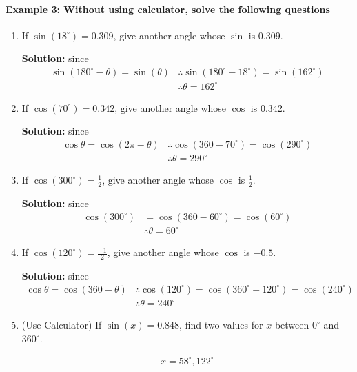 \documentclass{article}
\begin{document}
\paragraph{Example 3: Without using calculator, solve the following questions}
\begin{enumerate}[label=\alph*)]
  \item If $\sin(18^{\circ})= 0.309$, give another angle whose $\sin$ is $0.309$.
        
        {\scriptsize \textbf{Solution:} since}
        \[
        \begin{aligned}
          \sin(180^{\circ}-\theta) = \sin(\theta)
          &\therefore \sin(180^{\circ}-18^{\circ}) = \sin(162^{\circ}) \\
          &\therefore \theta = 162^{\circ}
        \end{aligned}
        \]

  \item If $\cos(70^{\circ})= 0.342$, give another angle whose $\cos$ is $0.342$.

        {\scriptsize \textbf{Solution:} since}
        \[
        \begin{aligned}
          \cos\theta = \cos(2\pi - \theta)
          &\therefore \cos(360-70^{\circ}) = \cos(290^{\circ}) \\
          &\therefore \theta = 290^{\circ}
        \end{aligned}
        \]

  \item If $\cos(300^{\circ})= \frac{1}{2}$, give another angle whose $\cos$ is $\frac{1}{2}$.

        {\scriptsize \textbf{Solution:} since}
        \[
        \begin{aligned}
          \cos(300^{\circ}) &= \cos(360-60^{\circ}) = \cos(60^{\circ}) \\
                       &\therefore \theta = 60^{\circ}
        \end{aligned}
        \]

  \item If $\cos(120^{\circ})= \frac{-1}{2}$, give another angle whose $\cos$ is $-0.5$.

        {\scriptsize \textbf{Solution:} since}
        \[
        \begin{aligned}
          \cos\theta = \cos(360-\theta)
          &\therefore \cos(120^{\circ}) = \cos(360^{\circ} - 120^{\circ}) = \cos(240^{\circ}) \\
          &\therefore \theta = 240^{\circ}
        \end{aligned}
        \]

  \item (Use Calculator) If $\sin(x)= 0.848$, find two values for $x$ between $0^{\circ}$ and $360^{\circ}$.

        \[
        \begin{aligned}
          x = 58^{\circ}, 122^{\circ}
        \end{aligned}
        \]
\end{enumerate}
\end{document}
